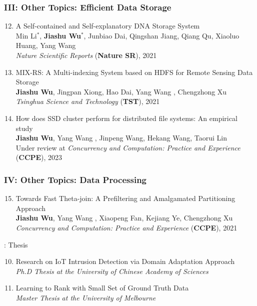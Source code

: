 \documentclass[letterpaper,11pt]{article}
\newcommand{\RNum}[1]{\uppercase\expandafter{\romannumeral #1\relax}}
\begin{document}
\subsubsection*{III: Other Topics: Efficient Data Storage}
\begin{enumerate}
  \setcounter{enumi}{11}
  \item A Self-contained and Self-explanatory DNA Storage System\\
  Min Li$^*$, \textbf{Jiashu Wu$^*$}, Junbiao Dai, Qingshan Jiang, Qiang Qu, Xiaoluo Huang, Yang Wang \Letter\\
  \textit{Nature Scientific Reports} (\textbf{Nature SR}), 2021

  \item MIX-RS: A Multi-indexing System based on HDFS for Remote Sensing Data Storage\\
  \textbf{Jiashu Wu}, Jingpan Xiong, Hao Dai, Yang Wang \Letter, Chengzhong Xu\\
  \textit{Tsinghua Science and Technology} (\textbf{TST}), 2021

  \item How does SSD cluster perform for distributed file systems: An empirical study\\
  \textbf{Jiashu Wu}, Yang Wang \Letter, Jinpeng Wang, Hekang Wang, Taorui Lin\\
  Under review at \textit{Concurrency and Computation: Practice and Experience} (\textbf{CCPE}), 2023
\end{enumerate}

\subsubsection*{IV: Other Topics: Data Processing}
\begin{enumerate}
  \setcounter{enumi}{14}
  \item Towards Fast Theta-join: A Prefiltering and Amalgamated Partitioning Approach\\
  \textbf{Jiashu Wu}, Yang Wang \Letter, Xiaopeng Fan, Kejiang Ye, Chengzhong Xu\\
  \textit{Concurrency and Computation: Practice and Experience} (\textbf{CCPE}), 2021
\end{enumerate}
\fi

\RNum{2}: Thesis
\begin{enumerate}
  \setcounter{enumi}{9}
  \item Research on IoT Intrusion Detection via Domain Adaptation Approach\\
  \textit{Ph.D Thesis at the University of Chinese Academy of Sciences}

  \item Learning to Rank with Small Set of Ground Truth Data\\
  \textit{Master Thesis at the University of Melbourne}
\end{enumerate}
\end{document}
